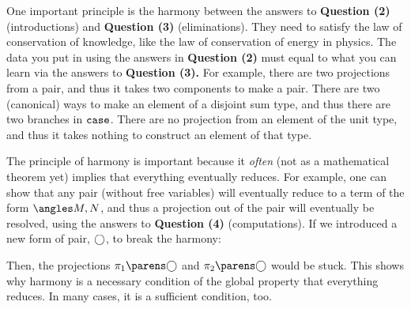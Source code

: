 \documentclass[11pt]{article}
\begin{document}
One important principle is the harmony between the answers to \textbf{Question (2)} (introductions) and \textbf{Question (3)} (eliminations). They need to satisfy the law of conservation of knowledge, like the law of conservation of energy in physics. The data you put in using the answers in \textbf{Question (2)} must equal to what you can learn via the answers to \textbf{Question (3).} For example, there are two projections from a pair, and thus it takes two components to make a pair. There are two (canonical) ways to make an element of a disjoint sum type, and thus there are two branches in $\sumcase$. There are no projection from an element of the unit type, and thus it takes nothing to construct an element of that type.

\NewDocumentCommand{\alianpair}{}{\bigcirc}

The principle of harmony is important because it \emph{often} (not as a mathematical theorem yet) implies that everything eventually reduces. For example, one can show that any pair (without free variables) will eventually reduce to a term of the form $\pair{M}{N}$, and thus a projection out of the pair will eventually be resolved, using the answers to \textbf{Question (4)} (computations). If we introduced a new form of pair, $\alianpair$, to break the harmony:
\begin{prooftree*}
\end{prooftree*}
Then, the projections $\pairfst{\alianpair}$ and $\pairsnd{\alianpair}$ would be stuck. This shows why harmony is a necessary condition of the global property that everything reduces. In many cases, it is a sufficient condition, too.

\printbibliography
\end{document}
